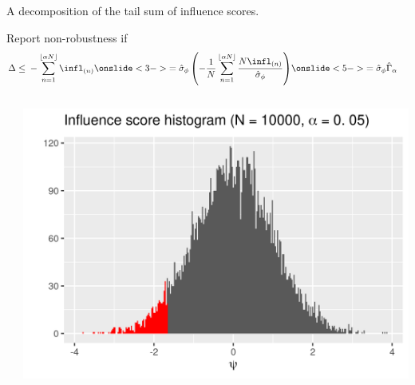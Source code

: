 \begin{frame}{A decomposition of the tail sum of influence scores.}

Report non-robustness if
\begin{align*}
    \vspace{-1em}
\Delta \le{}& - \sum_{n=1}^{\lfloor \alpha N \rfloor} \infl_{(n)}
\onslide<3->{
= \hat\sigma_\phi
    \left(
        - \frac{1}{N} \sum_{n=1}^{\lfloor \alpha N \rfloor}
        \frac{N \infl_{(n)}}{\hat\sigma_\phi}
    \right)
}
\onslide<5->{
 = \hat\sigma_\phi \hat\Gamma_\alpha
}
\end{align*}


\begin{columns}
\begin{column}{0.45\linewidth}
\end{column}

\begin{column}{0.45\linewidth}
\includegraphics[width=0.8\linewidth]{static_figures/simple_infl_example.png}
\end{column}
\end{columns}


\end{frame}
